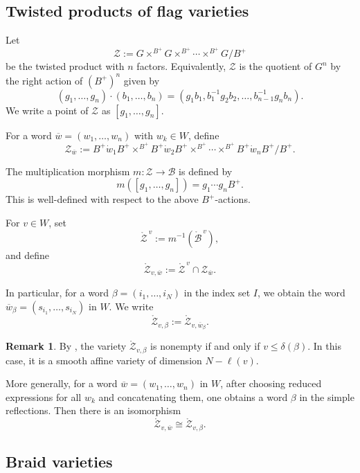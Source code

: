 \documentclass[12pt, reqno]{amsart}
\theoremstyle{plain}
\theoremstyle{definition}
\newtheorem{remark}[theorem]{Remark}
\numberwithin{equation}{section}
\begin{document}
\subsection{Twisted products of flag varieties}

Let
\[
\mathcal Z
:=
G\times^{B^+}G\times^{B^+}\cdots\times^{B^+}G/B^+
\]
be the twisted product with \(n\) factors. Equivalently, \(\mathcal Z\) is the
quotient of \(G^n\) by the right action of \((B^+)^n\) given by
\[
(g_1,\dots,g_n)\cdot(b_1,\dots,b_n)
=
(g_1b_1,b_1^{-1}g_2b_2,\dots,b_{n-1}^{-1}g_nb_n).
\]
We write a point of \(\mathcal Z\) as \([g_1,\dots,g_n]\).

For a word
\(
\overline w=(w_1,\dots,w_n)
\)
with \(w_k\in W\), define
\[
\mathcal Z_{\overline w}
:=
B^+\dot w_1B^+
\times^{B^+}
B^+\dot w_2B^+
\times^{B^+}
\cdots
\times^{B^+}
B^+\dot w_nB^+/B^+.
\]

The multiplication morphism
\(
m:\mathcal Z\to \mathcal B
\)
is defined by
\[
m([g_1,\dots,g_n])
=
g_1\cdots g_nB^+.
\]
This is well-defined with respect to the above \(B^+\)-actions.

For \(v\in W\), set
\[
\mathring{\mathcal Z}^{\,v}
:=
m^{-1}(\mathring{\mathcal B}^{\,v}),
\]
and define
\[
\mathring{\mathcal Z}_{v,\overline w}
:=
\mathring{\mathcal Z}^{\,v}\cap \mathcal Z_{\overline w}.
\]

In particular, for a word \(\beta=(i_1,\dots,i_N)\) in the index set \(I\), we
obtain the word
\(
\overline w_\beta=(s_{i_1},\dots,s_{i_N})
\)
in \(W\). We write
\[
\mathring{\mathcal Z}_{v,\beta}
:=
\mathring{\mathcal Z}_{v,\overline w_\beta}.
\]

\begin{remark}
By \cite{bao2022total}, the variety
\(\mathring{\mathcal Z}_{v,\beta}\) is nonempty if and only if
\(
v\le \delta(\beta).
\)
In this case, it is a smooth affine variety of dimension
\(N-\ell(v).
\)

More generally, for a word \(\overline w=(w_1,\dots,w_n)\) in \(W\), after
choosing reduced expressions for all \(w_k\) and concatenating them, one obtains
a word \(\beta\) in the simple reflections. Then there is an isomorphism
\[
\mathring{\mathcal Z}_{v,\overline w}
\cong
\mathring{\mathcal Z}_{v,\beta}.
\]
\end{remark}





\subsection{Braid varieties}
\end{document}
